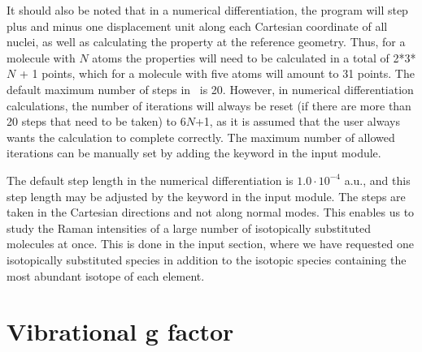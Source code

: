It should also be noted that  in a numerical
differentiation, the
program will
step plus and minus one displacement unit along each Cartesian coordinate
of all nuclei, as well as calculating the property at the reference
geometry. Thus, for a molecule with $N$ atoms the properties will need
to be calculated in a total of 2*3*$N$ + 1 points, which for a
molecule with five atoms will amount to 31 points. The default maximum number of
steps in \dalton\ is 20. However, in numerical differentiation
calculations, the number of iterations will always be reset (if there
are more than 20 steps that need to be taken) to 6$N$+1, as it is
assumed that the user always wants the calculation to complete
correctly. The maximum number of allowed iterations can be manually set by adding the keyword
 in the  input module.

The default step length in the numerical
differentiation is $1.0\cdot 10^{-4}$
a.u., and this step length may be adjusted by the keyword
 in the  input module. The steps are taken
in the Cartesian directions and
not along normal modes. This enables us to study the Raman intensities
of a large number of isotopically substituted molecules at once. This
is done in the  input section, where we
have requested one isotopically substituted species in addition to the
isotopic species containing the most abundant isotope of each element.


\section{Vibrational g factor}




\begin{center}
\end{center}

